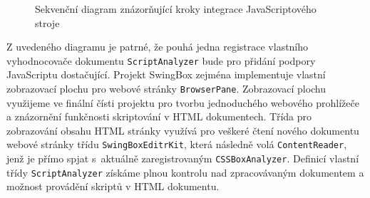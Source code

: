 \begin{figure}[H]
  \begin{center}
    \caption{Sekvenční diagram znázorňující kroky integrace JavaScriptového stroje}
    \label{Figure.SwingBoxIntegrationDesign}
  \end{center}
\end{figure}

Z uvedeného diagramu je patrné, že pouhá jedna registrace vlastního vyhodnocovače dokumentu \texttt{ScriptAnalyzer} bude pro přidání podpory JavaScriptu dostačující. Projekt SwingBox zejména implementuje vlastní zobrazovací plochu pro webové stránky \texttt{BrowserPane}. Zobrazovací plochu využijeme ve finální čísti projektu pro tvorbu jednoduchého webového prohlížeče a znázornění funkčnosti skriptování v HTML dokumentech. Třída pro zobrazování obsahu HTML stránky využívá pro veškeré čtení nového dokumentu webové stránky třídu \texttt{SwingBoxEditrKit}, která následně volá \texttt{ContentReader}, jenž je přímo spjat s~aktuálně zaregistrovaným \texttt{CSSBoxAnalyzer}. Definicí vlastní třídy \texttt{ScriptAnalyzer} získáme plnou kontrolu nad zpracovávaným dokumentem a možnost provádění skriptů v HTML dokumentu. 

